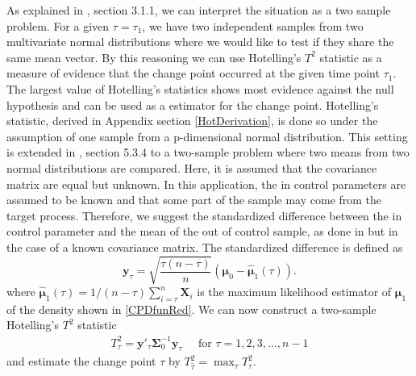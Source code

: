 As explained in \citet{CPDbook}, section 3.1.1, we can interpret the situation as a two sample problem. For a given $\tau=\tau_1$, we have two independent samples from two multivariate normal distributions where we would like to test if they share the same mean vector. By this reasoning we can use Hotelling's $T^2$ statistic as a measure of evidence that the change point occurred at the given time point $\tau_1$. The largest value of Hotelling's statistics shows most evidence against the null hypothesis and can be used as a estimator for the change point. 
Hotelling's statistic, derived in Appendix section \ref{HotDerivation}, is done so under the assumption of one sample from a p-dimensional normal distribution. This setting is extended in \citet{MultStatAnalysis}, section 5.3.4 to a two-sample problem where two means from two normal distributions are compared. Here, it is assumed that the covariance matrix are equal but unknown. In this application, the in control parameters are assumed to be known and that some part of the sample may come from the target process. Therefore, we suggest the standardized difference between the in control parameter and the mean of the out of control sample, as done in \citet{MultStatAnalysis} but in the case of a known covariance matrix. The standardized difference is defined as 
$$
\mathbf{y}_{\tau} = \sqrt{\frac{\tau(n-\tau)}{n}}(\boldsymbol{\mu}_0-\hat{\boldsymbol{\mu}}_1(\tau)).
$$
where $\hat{\boldsymbol{\mu}}_1(\tau)=1/(n-\tau)\sum_{i=\tau}^{n} \mathbf{X}_i$ is the maximum likelihood estimator of $\boldsymbol{\mu}_1$ of the density shown in \eqref{CPDfunRed}. We can now construct a two-sample Hotelling's $T^2$ statistic 
\begin{align}
T^2_{\tau}=\mathbf{y}'_{\tau} \boldsymbol{\Sigma}^{-1}_0 \mathbf{y}_{\tau} \;\;\;\;\; \text{for } \tau=1,2,3,...,n-1
\end{align}
and estimate the change point $\tau$ by $T^2_{\hat{\tau}} = \max_{\tau} T^2_{\tau}$.


